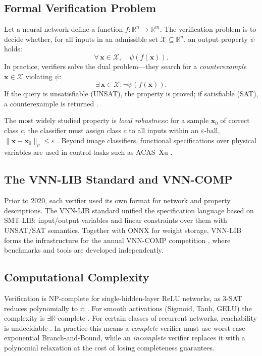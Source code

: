 \documentclass[11pt]{article}
\begin{document}
\subsection{Formal Verification Problem}

Let a neural network define a function $f: \mathbb{R}^n \to \mathbb{R}^m$.
The verification problem is to decide whether, for all inputs in an admissible
set $\mathcal{X} \subseteq \mathbb{R}^n$, an output property $\psi$ holds:
\[
  \forall\, \mathbf{x} \in \mathcal{X},\quad \psi(f(\mathbf{x})).
\]
In practice, verifiers solve the dual problem---they search for a
\emph{counterexample} $\mathbf{x} \in \mathcal{X}$ violating $\psi$:
\[
  \exists\, \mathbf{x} \in \mathcal{X} : \neg\psi(f(\mathbf{x})).
\]
If the query is unsatisfiable (UNSAT), the property is proved; if satisfiable
(SAT), a counterexample is returned \citep{marzari2025advancingneuralnetworkverification}.

The most widely studied property is \emph{local robustness}: for a sample
$\mathbf{x}_0$ of correct class $c$, the classifier must assign class $c$ to
all inputs within an $\varepsilon$-ball,
$\|\mathbf{x}-\mathbf{x}_0\|_p \leq \varepsilon$ \citep{DBLP:journals/corr/abs-2002-03339}.
Beyond image classifiers, functional specifications over physical variables are
used in control tasks such as ACAS~Xu \citep{Demarchi2023SupportingStandardization}.

\subsection{The VNN-LIB Standard and VNN-COMP}

Prior to 2020, each verifier used its own format for network and property
descriptions. The VNN-LIB standard \citep{VNNLIBWebsite} unified the
specification language based on SMT-LIB: input/output variables and linear
constraints over them with UNSAT/SAT semantics. Together with ONNX for weight
storage, VNN-LIB forms the infrastructure for the annual VNN-COMP competition
\citep{arXiv2212VNNCOMP2022, arXiv2312VNNCOMP2023, arXiv2412VNNCOMP2024},
where benchmarks and tools are developed independently.

\subsection{Computational Complexity}

Verification is NP-complete for single-hidden-layer ReLU networks, as 3-SAT
reduces polynomially to it \citep{arXiv2403RobustnessVerification}. For
smooth activations (Sigmoid, Tanh, GELU) the complexity is
$\exists\mathbb{R}$-complete \citep{NeurIPS2021ExistsRComplete}. For certain
classes of recurrent networks, reachability is undecidable
\citep{IJCAI2018ReachabilityDNN}. In practice this means a \emph{complete}
verifier must use worst-case exponential Branch-and-Bound, while an
\emph{incomplete} verifier replaces it with a polynomial relaxation at the cost
of losing completeness guarantees.
\end{document}
